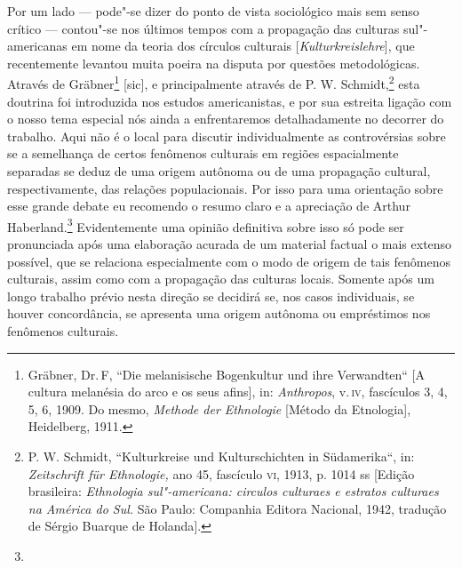 Por um lado --- pode"-se dizer do ponto de vista sociológico mais sem
senso crítico --- contou"-se nos últimos tempos com a propagação das
culturas sul"-americanas em nome da teoria dos círculos culturais
{[}\emph{Kulturkreislehre}{]}, que recentemente levantou muita poeira na
disputa por questões metodológicas. Através de Gräbner\footnote{Gräbner,
  Dr.\,F, ``Die melanisische Bogenkultur und ihre Verwandten`` {[}A
  cultura melanésia do arco e os seus afins{]}, in: \emph{Anthropos}, v.\,\textsc{iv}, fascículos 3, 4, 5, 6, 1909. Do mesmo, \emph{Methode der
  Ethnologie} {[}Método da Etnologia{]}, Heidelberg, 1911.} {[}sic{]}, e
principalmente através de P. W. Schmidt,\footnote{P. W. Schmidt,
  ``Kulturkreise und Kulturschichten in Südamerika``, in:
  \emph{Zeitschrift für Ethnologie,} ano 45, fascículo \textsc{vi}, 1913, p. 1014
  ss {[}Edição brasileira: \emph{Ethnologia sul"-americana: circulos
  culturaes e estratos culturaes na América do Sul.} São Paulo:
  Companhia Editora Nacional, 1942, tradução de Sérgio Buarque de
  Holanda{]}.} esta doutrina foi introduzida nos estudos
americanistas, e por sua estreita ligação com o nosso tema especial nós
ainda a enfrentaremos detalhadamente no decorrer do trabalho. Aqui não é
o local para discutir individualmente as controvérsias sobre se a
semelhança de certos fenômenos culturais em regiões espacialmente
separadas se deduz de uma origem autônoma ou de uma propagação
cultural, respectivamente, das relações populacionais. Por isso para uma
orientação sobre esse grande debate eu recomendo o resumo claro e a
apreciação de Arthur Haberland.\footnote{} Evidentemente uma opinião
definitiva sobre isso só pode ser pronunciada após uma elaboração
acurada de um material factual o mais extenso possível, que se
relaciona especialmente com o modo de origem de tais fenômenos
culturais, assim como com a propagação das culturas locais. Somente após
um longo trabalho prévio nesta direção se decidirá se, nos casos
individuais, se houver concordância, se apresenta uma origem autônoma ou
empréstimos nos fenômenos culturais.

